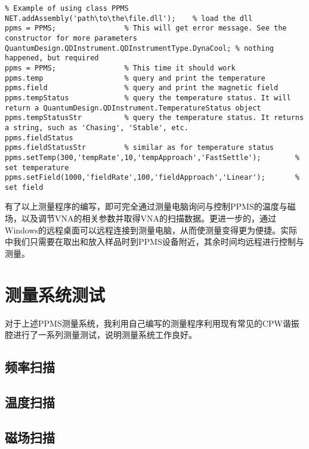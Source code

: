             \begin{lstlisting}
% Example of using class PPMS
NET.addAssembly('path\to\the\file.dll');	% load the dll
ppms = PPMS;				% This will get error message. See the constructor for more parameters
QuantumDesign.QDInstrument.QDInstrumentType.DynaCool; % nothing happened, but required
ppms = PPMS;				% This time it should work
ppms.temp					% query and print the temperature
ppms.field					% query and print the magnetic field
ppms.tempStatus				% query the temperature status. It will return a QuantumDesign.QDInstrument.TemperatureStatus object
ppms.tempStatusStr			% query the temperature status. It returns a string, such as 'Chasing', 'Stable', etc.
ppms.fieldStatus
ppms.fieldStatusStr			% similar as for temperature status
ppms.setTemp(300,'tempRate',10,'tempApproach','FastSettle');		% set temperature
ppms.setField(1000,'fieldRate',100,'fieldApproach','Linear');		% set field
            \end{lstlisting}

            有了以上测量程序的编写，即可完全通过测量电脑询问与控制PPMS的温度与磁场，以及调节VNA的相关参数并取得VNA的扫描数据。更进一步的，通过Windows的远程桌面可以远程连接到测量电脑，从而使测量变得更为便捷。实际中我们只需要在取出和放入样品时到PPMS设备附近，其余时间均远程进行控制与测量。

            \section{测量系统测试} %
            \label{sec:测量系统测试}
                  对于上述PPMS测量系统，我利用自己编写的测量程序利用现有常见的CPW谐振腔进行了一系列测量测试，说明测量系统工作良好。

                  \subsection{频率扫描} %
                  \label{sub:频率扫描}
                        

                  \subsection{温度扫描} %
                  \label{sub:温度扫描}
                        

                  \subsection{磁场扫描} %
                  \label{sub:磁场扫描}
                        
